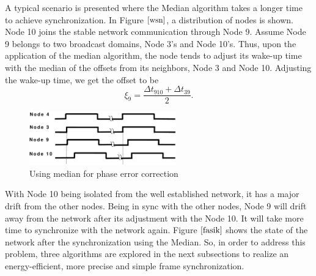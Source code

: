 \documentclass[journal]{IEEEtran}
\begin{document}
\newline A typical scenario is presented where the Median algorithm takes a longer time to achieve synchronization. In Figure $\ref{wsn}$, a distribution of nodes is shown. Node 10 joins  the stable network communication through Node 9. Assume Node 9 belongs to two broadcast domains, Node 3's and Node 10's. Thus, upon the application of the median algorithm, the node tends to adjust its wake-up time with the median of the offsets from its neighbors, Node 3 and Node 10. Adjusting the wake-up time, we get the offset to be
\begin{equation}
\xi_9 = \frac{\Delta t_{910} + \Delta t_{39}}{2}.
\end{equation}
\begin{figure}[t]
\centering
\includegraphics[width= 2.5in]{offsetpic}
\caption{Using median for phase error correction} \label{fasik}
\end{figure}
\noindent With Node 10 being isolated from the well established
network, it has a major drift from the other nodes. Being in sync
with the other nodes, Node 9 will drift away from the network after
its adjustment with the Node 10. It will take more time to
synchronize with the network again. Figure $\ref{fasik}$ shows the state of the network after the
synchronization using the Median. 
\newline So, in order to address this problem, three algorithms are explored in the next subsections to realize an energy-efficient, more precise and simple frame synchronization.
\end{document}
